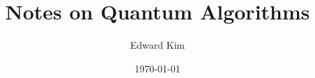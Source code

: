 \documentclass[12pt]{article}
\title{\vspace{-7ex}Notes on Quantum Algorithms \vspace{-2ex}}
\author{Edward Kim}
\date{\vspace{-2ex}\today}
\begin{document}
\maketitle

\renewcommand{\baselinestretch}{0.25}\normalsize
\tableofcontents
\renewcommand{\baselinestretch}{1.0}\normalsize





\nocite{*}


\end{document}
